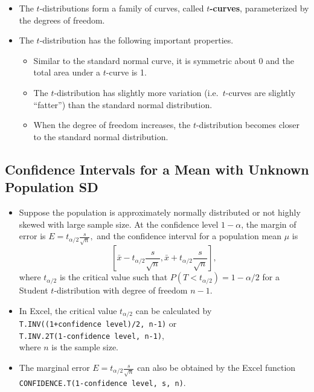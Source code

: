 \begin{itemize}
\item
  The \(t\)-distributions form a family of curves, called
  \textbf{\(t\)-curves}, parameterized by the
  degrees of freedom.
\item
  The \(t\)-distribution has the following important properties.

  \begin{itemize}
  \item
    Similar to the standard normal curve, it is symmetric about
    0 and the total area under a \(t\)-curve is
    1.
  \item
    The \(t\)-distribution has slightly more variation
    (i.e.~\(t\)-curves are slightly ``fatter'') than the
    standard normal distribution.
  \item
    When the degree of freedom increases, the
    \(t\)-distribution becomes closer to the standard normal
    distribution.
  \end{itemize}
\end{itemize}

\hypertarget{confidence-intervals-for-a-mean-with-unknown-population-sd}{%
\subsection{\texorpdfstring{Confidence Intervals for a Mean with
\textbf{Unknown} Population
SD}{Confidence Intervals for a Mean with Unknown Population SD}}\label{confidence-intervals-for-a-mean-with-unknown-population-sd}}

\begin{itemize}
\item
  Suppose the population is approximately normally distributed or not highly skewed with large sample size.
  At the confidence level \(1-\alpha\), the margin of error is
  \(E=t_{\alpha/2}\frac{s}{\sqrt{n}},\) and the confidence interval for
  a population mean \(\mu\) is
  \[\left[\bar{x}-t_{\alpha/2}\frac{s}{\sqrt{n}}, \bar{x}+t_{\alpha/2}\frac{s}{\sqrt{n}}\right],\]
  where \(t_{\alpha/2}\) is the critical value such that
  \(P(T<t_{\alpha/2})=1-\alpha/2\) for a Student \(t\)-distribution with
  degree of freedom \(n-1\).
\item
  In Excel, the critical value \(t_{\alpha/2}\) can be calculated by\\
  \texttt{T.INV((1+confidence\ level)/2,\ n-1)} or\\
  \texttt{T.INV.2T(1-confidence\ level,\ n-1)},\\ where \(n\) is the
  sample size.
\item
  The marginal error \(E=t_{\alpha/2}\frac{s}{\sqrt{n}}\) can also be
  obtained by the Excel function\\
  \texttt{CONFIDENCE.T(1-confidence\ level,\ s,\ n)}.
\end{itemize}

